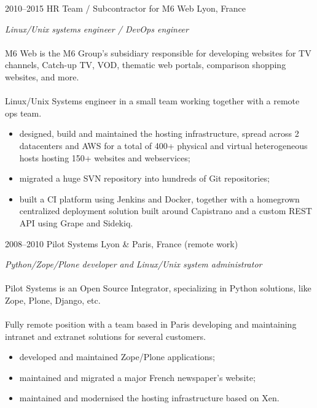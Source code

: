 \documentclass[]{friggeri-cv}
\begin{document}
\begin{entrylist}
  \entry
    {2010--2015}
    {HR Team / Subcontractor for M6 Web}
    {Lyon, France}
    {
      \textit{Linux/Unix systems engineer / DevOps engineer} \\
      \\
      M6 Web is the M6 Group’s subsidiary responsible for developing websites
      for TV channels, Catch-up TV, VOD, thematic web portals, comparison
      shopping websites, and more. \\
      \\
      Linux/Unix Systems engineer in a small team working
      together with a remote ops team.
      \\
      \begin{itemize}
        \item designed, build and maintained the hosting infrastructure, spread
              across 2 datacenters and AWS for a total of 400+ physical and
              virtual heterogeneous hosts hosting 150+ websites and
              webservices;
        \item migrated a huge SVN repository into hundreds of Git repositories;
        \item built a CI platform using Jenkins and Docker, together with a
              homegrown centralized deployment solution built around Capistrano
              and a custom REST API using Grape and Sidekiq.
      \end{itemize}
    }

  \entry
    {2008--2010}
    {Pilot Systems}
    {Lyon \& Paris, France (remote work)}
    {
      \textit{Python/Zope/Plone developer and Linux/Unix system administrator} \\
      \\
      Pilot Systems is an Open Source Integrator, specializing in Python
      solutions, like Zope, Plone, Django, etc. \\
      \\
      Fully remote position with a team based in Paris developing and maintaining intranet
      and extranet solutions for several customers.
      \\
      \begin{itemize}
        \item developed and maintained Zope/Plone applications;
        \item maintained and migrated a major French newspaper's website;
        \item maintained and modernised the hosting infrastructure based on
              Xen.
      \end{itemize}
    }


\end{entrylist}
\end{document}
